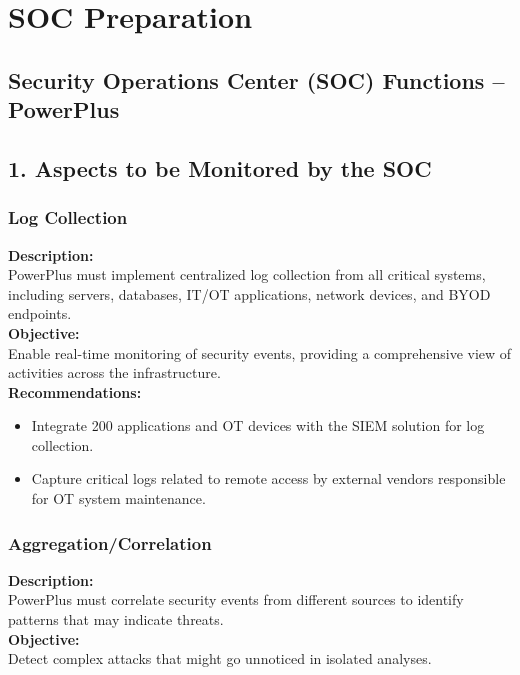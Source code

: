 \chapter{SOC Preparation}

\section*{Security Operations Center (SOC) Functions – PowerPlus}

\section*{1. Aspects to be Monitored by the SOC}

\subsection*{ Log Collection}
\textbf{Description:} \\
PowerPlus must implement centralized log collection from all critical systems, including servers, databases, IT/OT applications, network devices, and BYOD endpoints. \\

\textbf{Objective:} \\
Enable real-time monitoring of security events, providing a comprehensive view of activities across the infrastructure. \\

\textbf{Recommendations:}
\begin{itemize}
    \item Integrate 200 applications and OT devices with the SIEM solution for log collection.
    \item Capture critical logs related to remote access by external vendors responsible for OT system maintenance.
\end{itemize}

\subsection*{ Aggregation/Correlation}
\textbf{Description:} \\
PowerPlus must correlate security events from different sources to identify patterns that may indicate threats. \\

\textbf{Objective:} \\
Detect complex attacks that might go unnoticed in isolated analyses. \\

